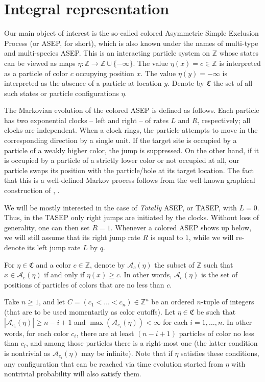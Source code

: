 \documentclass[11pt,reqno]{amsart}
\theoremstyle{definition}
\theoremstyle{remark}
\theoremstyle{remark}
\def\geq{\geqslant}
\renewcommand\ge{\geq}
\def\Z{\mathbb Z}
\def\A{\mathcal A}
\numberwithin{equation}{section}
\begin{document}
	\section{Integral representation}\label{sec:integral}
	
	Our main object of interest is the so-called colored Asymmetric Simple Exclusion Process (or ASEP, for short), which is also known under the names of multi-type and multi-species ASEP. This is an interacting particle system on $\Z$ 
	whose states can be viewed as maps $\eta:\Z\to\Z\cup\{-\infty\}$. The value $\eta(x)=c\in \Z$ is interpreted as a particle of color $c$ occupying position $x$. The value $\eta(y)=-\infty$ is interpreted as the absence of a particle at location $y$. Denote by $\mathfrak C$ the set of all such states or particle configurations $\eta$.  
	
	The Markovian evolution of the colored ASEP is defined as follows. Each particle has two exponential clocks -- left and right -- of rates $L$ and $R$, respectively; all clocks are independent. When a clock rings, the particle attempts to move in the corresponding direction by a single unit. If the target site is occupied by a particle of a weakly higher color, the jump is suppressed. On the other hand, if it is occupied by a particle of a strictly lower color or not occupied at all, our particle swaps its position with the particle/hole at its target location. The fact that this is a well-defined Markov process follows from the well-known graphical construction of \cite{Harris1965}, \cite{Liggett1976}.
	
	We will be mostly interested in the case of \emph{Totally} ASEP, or TASEP, with $L=0$. Thus, in the TASEP only right jumps are initiated by the clocks. Without loss of generality, one can then set $R=1$. Whenever a colored ASEP shows up below, we will still assume that its right jump rate $R$ is equal to $1$, while we will re-denote its left jump rate $L$ by $q$. 
	
	For $\eta\in\mathfrak C$ and a color $c\in\Z$, denote by $\A_c(\eta)$ the subset of $\Z$ such that $x\in \A_c(\eta)$ if and only if $\eta(x)\ge c$. In other words, $\A_c(\eta)$ is the set of positions of particles of colors that are no less than $c$. 
	
	Take $n\ge1$, and let $C=(c_1<\dots<c_n)\in \Z^n$ be an ordered $n$-tuple of integers (that are to be used momentarily as color cutoffs). Let $\eta\in\mathfrak C$ be such that $|\A_{c_i}(\eta)|\ge n-i+1$ and $\max(\A_{c_i}(\eta))<\infty$ for each $i=1,\dots,n$. In other words, for each color $c_i$, there are at least $(n-i+1)$ particles of color no less than $c_i$, and among those particles there is a right-most one (the latter condition is nontrivial as $\A_{c_i}(\eta)$ may be infinite). Note that if $\eta$ satisfies these conditions, any configuration that can be reached via time evolution started from $\eta$ with nontrivial probability will also satisfy them. 
	
\end{document}
